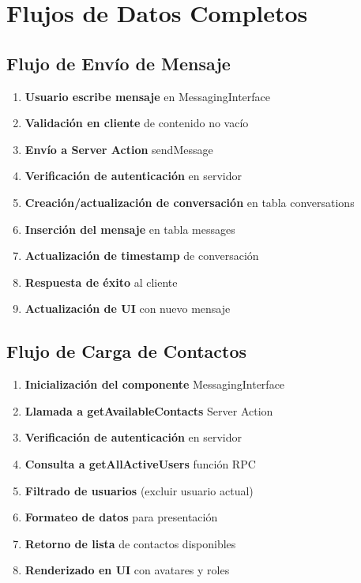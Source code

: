 \documentclass[12pt,a4paper]{article}
\begin{document}
\section{Flujos de Datos Completos}

\subsection{Flujo de Envío de Mensaje}

\begin{enumerate}
    \item \textbf{Usuario escribe mensaje} en MessagingInterface
    \item \textbf{Validación en cliente} de contenido no vacío
    \item \textbf{Envío a Server Action} sendMessage
    \item \textbf{Verificación de autenticación} en servidor
    \item \textbf{Creación/actualización de conversación} en tabla conversations
    \item \textbf{Inserción del mensaje} en tabla messages
    \item \textbf{Actualización de timestamp} de conversación
    \item \textbf{Respuesta de éxito} al cliente
    \item \textbf{Actualización de UI} con nuevo mensaje
\end{enumerate}

\subsection{Flujo de Carga de Contactos}

\begin{enumerate}
    \item \textbf{Inicialización del componente} MessagingInterface
    \item \textbf{Llamada a getAvailableContacts} Server Action
    \item \textbf{Verificación de autenticación} en servidor
    \item \textbf{Consulta a getAllActiveUsers} función RPC
    \item \textbf{Filtrado de usuarios} (excluir usuario actual)
    \item \textbf{Formateo de datos} para presentación
    \item \textbf{Retorno de lista} de contactos disponibles
    \item \textbf{Renderizado en UI} con avatares y roles
\end{enumerate}
\end{document}
